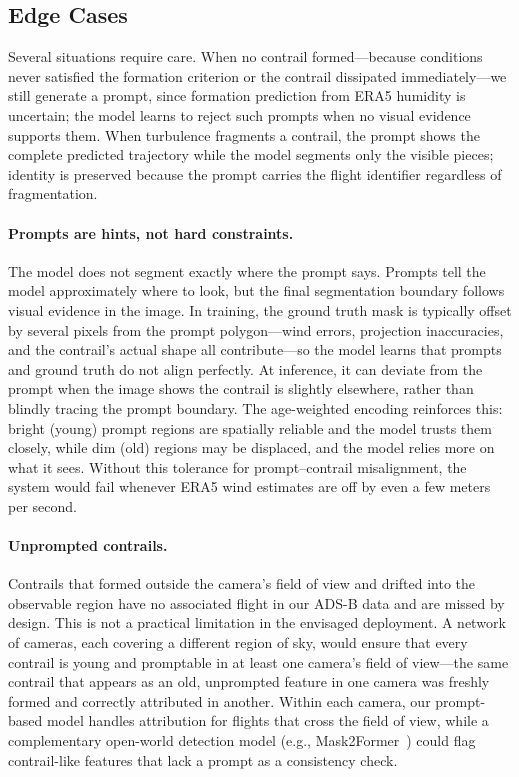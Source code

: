 \documentclass[1p,11pt]{elsarticle}
\begin{document}
\subsection{Edge Cases}

Several situations require care. When no contrail formed---because conditions never satisfied the formation criterion or the contrail dissipated immediately---we still generate a prompt, since formation prediction from ERA5 humidity is uncertain; the model learns to reject such prompts when no visual evidence supports them. When turbulence fragments a contrail, the prompt shows the complete predicted trajectory while the model segments only the visible pieces; identity is preserved because the prompt carries the flight identifier regardless of fragmentation.

\paragraph{Prompts are hints, not hard constraints.} The model does not segment exactly where the prompt says. Prompts tell the model approximately where to look, but the final segmentation boundary follows visual evidence in the image. In training, the ground truth mask is typically offset by several pixels from the prompt polygon---wind errors, projection inaccuracies, and the contrail's actual shape all contribute---so the model learns that prompts and ground truth do not align perfectly. At inference, it can deviate from the prompt when the image shows the contrail is slightly elsewhere, rather than blindly tracing the prompt boundary. The age-weighted encoding reinforces this: bright (young) prompt regions are spatially reliable and the model trusts them closely, while dim (old) regions may be displaced, and the model relies more on what it sees. Without this tolerance for prompt--contrail misalignment, the system would fail whenever ERA5 wind estimates are off by even a few meters per second.

\paragraph{Unprompted contrails.} Contrails that formed outside the camera's field of view and drifted into the observable region have no associated flight in our ADS-B data and are missed by design. This is not a practical limitation in the envisaged deployment. A network of cameras, each covering a different region of sky, would ensure that every contrail is young and promptable in at least one camera's field of view---the same contrail that appears as an old, unprompted feature in one camera was freshly formed and correctly attributed in another. Within each camera, our prompt-based model handles attribution for flights that cross the field of view, while a complementary open-world detection model (e.g., Mask2Former~\cite{jarry2025gvccs}) could flag contrail-like features that lack a prompt as a consistency check.
\end{document}
